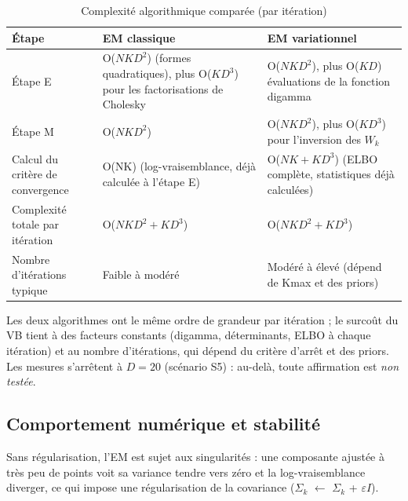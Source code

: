 \begin{table}[H]
\centering
\small
\setlength{\tabcolsep}{0.14cm}
\begin{tabular}{|p{4.84cm}|p{4.84cm}|p{4.84cm}|}
\hline
\textbf{Étape} & \textbf{EM classique} & \textbf{EM variationnel} \\
\hline
Étape E & O($NKD^{2}$) (formes quadratiques), plus O($KD^{3}$) pour les factorisations de Cholesky & O($NKD^{2}$), plus O($KD$) évaluations de la fonction digamma \\
\hline
Étape M & O($NKD^{2}$) & O($NKD^{2}$), plus O($KD^{3}$) pour l'inversion des $W_{k}$ \\
\hline
Calcul du critère de convergence & O(NK) (log-vraisemblance, déjà calculée à l'étape E) & O($NK + KD^{3}$) (ELBO complète, statistiques déjà calculées) \\
\hline
Complexité totale par itération & O($NKD^{2} + KD^{3}$) & O($NKD^{2} + KD^{3}$) \\
\hline
Nombre d'itérations typique & Faible à modéré & Modéré à élevé (dépend de Kmax et des priors) \\
\hline
\end{tabular}
\caption{Complexité algorithmique comparée (par itération)}
\label{tab:2_3}
\end{table}
Les deux algorithmes ont le même ordre de grandeur par itération ; le surcoût du VB tient à des facteurs constants (digamma, déterminants, ELBO à chaque itération) et au nombre d'itérations, qui dépend du critère d'arrêt et des priors. Les mesures s'arrêtent à $D = 20$ (scénario S5) : au-delà, toute affirmation est \emph{non testée}.

\subsection{Comportement numérique et stabilité}\label{sec:comportement_numerique_et_stabilite}
Sans régularisation, l'EM est sujet aux singularités : une composante ajustée à très peu de points voit sa variance tendre vers zéro et la log-vraisemblance diverger, ce qui impose une régularisation de la covariance ($\Sigma _{k}$ $\leftarrow $ $\Sigma _{k}$ + $\varepsilon I$).

